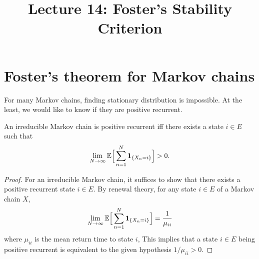 \documentclass[a4paper,10pt,english]{article}
\title{Lecture 14: Foster's Stability Criterion}
\date{}%
\author{}
\begin{document}
\maketitle
\section{Foster's theorem for Markov chains}
For many Markov chains, finding stationary distribution is impossible. 
At the least, we would like to know if they are positive recurrent. 

\begin{lem} 
An irreducible Markov chain is positive recurrent iff there exists a state $i \in E$ such that
\begin{align*}
\lim_{N \to \infty} \E\Big[ \sum_{n=1}^{N} \boldsymbol{1}_{\{X_n=i \}} \Big] > 0. %
\end{align*}
\end{lem}
\begin{proof}
For an irreducible Markov chain, it suffices to show that there exists a positive recurrent state $i \in E$. 
By renewal theory, for any state $i \in E$ of a Markov chain $X$,
\begin{align*}
\lim_{N \to \infty} \mathbb{E}\Big[ \sum_{n=1}^{N} \boldsymbol{1}_{\{X_n=i\}} \Big] = \frac{1}{\mu _{ii}} 
\end{align*}
where $\mu_{ii}$ is the mean return time to state $i$, 
This implies that a state $i \in E$ being positive recurrent is equivalent to the given hypothesis $1/\mu_{ii} > 0$. 
\end{proof}
\end{document}
